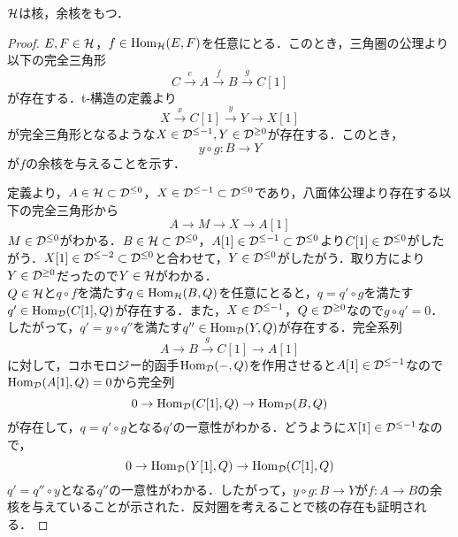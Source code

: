 \begin{lemm}\cite{BBD}
	${\mathcal H}$は核，余核をもつ．
\end{lemm}
\begin{proof}
	$E,F\in{\mathcal H}$，$f\in\operatorname{\mathrm{Hom}}_{{\mathcal H}}(E,F)$を任意にとる．このとき，三角圏の公理より以下の完全三角形
	\[C\xrightarrow{e}A\xrightarrow{f}B\xrightarrow{g}C[1]\]
	が存在する．t-構造の定義より
	\[X\xrightarrow{x}C[1]\xrightarrow{y}Y\rightarrow X[1]\]
	が完全三角形となるような$X\in {\mathcal D}^{\le -1},Y\in {\mathcal D}^{\ge 0}$が存在する．このとき，
	\[y\circ g\colon B\rightarrow Y\]
	が$f$の余核を与えることを示す．
	\begin{comment}
			\[
				\begin{tikzcd}[column sep=huge,row sep =huge]
					B[-1] \ar[r,"g\texttt{[-1]}"]\ar[d,equal]& C\ar[r,]\ar[d,"y\texttt{[-1]}",swap]& A\ar[d,"\ell",dotted] \ar[r,"f"]& B\ar[d,equal]\\
					B[-1] \ar[r,"y\texttt{[-1]}\circ g\texttt{[-1]}"]\ar[d,"g\texttt{[-1]}",swap]& Y[-1]\ar[r,]\ar[d,equal]& M\ar[d,dotted] \ar[r,"m"]& B\ar[d,"g"]\\
					C \ar[r,]\ar[d,swap]& Y[-1]\ar[r,]\ar[d,swap]& X \ar[r,"x"]\ar[d,equal]& C[1] \ar[d,]\\
			A \ar[r,"\ell",dotted]& M\ar[r,dotted]&  X\ar[r,dotted]& A[1]\\
		\end{tikzcd}
			\]
\end{comment}	
			定義より，$A\in{\mathcal H}\subset{\mathcal D}^{\le 0}$，$X\in{\mathcal D}^{\le -1}\subset{\mathcal D}^{\le 0}$であり，八面体公理より存在する以下の完全三角形から
	\[A\rightarrow M\rightarrow X\rightarrow A[1]\]
	$M\in{\mathcal D}^{\le 0}$がわかる．$B\in{\mathcal H}\subset{\mathcal D}^{\le 0}$，$A[1]\in {\mathcal D}^{\le -1}\subset {\mathcal D}^{\le 0}$より$C[1]\in{\mathcal D}^{\le 0}$がしたがう．$X[1]\in{\mathcal D}^{\le -2}\subset{\mathcal D}^{\le 0}$と合わせて，$Y\in{\mathcal D}^{\le 0}$がしたがう．取り方により$Y\in{\mathcal D}^{\ge 0}$だったので$Y\in{\mathcal H}$がわかる．\\
	$Q\in{\mathcal H}$と$q\circ f$を満たす$q\in\operatorname{\mathrm{Hom}}_{{\mathcal H}}(B,Q)$を任意にとると，$q=q'\circ g$を満たす$q'\in\operatorname{\mathrm{Hom}}_{{\mathcal D}}(C[1],Q)$が存在する．また，$X\in{\mathcal D}^{\le -1}$，$Q\in{\mathcal D}^{\ge 0}$なので$g\circ q'=0$．したがって，$q'=y\circ q''$を満たす$q''\in\operatorname{\mathrm{Hom}}_{{\mathcal D}}(Y,Q)$が存在する．完全系列
	\[A\rightarrow B\xrightarrow{g} C[1]\rightarrow A[1]\]
	に対して，コホモロジー的函手$\operatorname{\mathrm{Hom}}_{{\mathcal D}}(-,Q)$を作用させると$A[1]\in{\mathcal D}^{\le -1}$なので$\operatorname{\mathrm{Hom}}_{{\mathcal D}}(A[1],Q)=0$から完全列
	\[0\rightarrow \operatorname{\mathrm{Hom}}_{{\mathcal D}}(C[1],Q) \rightarrow \operatorname{\mathrm{Hom}}_{{\mathcal D}}(B,Q)\]
	が存在して，$q=q'\circ g$となる$q'$の一意性がわかる．どうように$X[1]\in{\mathcal D}^{\le -1}$なので，
	\[0\rightarrow \operatorname{\mathrm{Hom}}_{{\mathcal D}}(Y[1],Q) \rightarrow \operatorname{\mathrm{Hom}}_{{\mathcal D}}(C[1],Q)\]
	$q'=q''\circ y$となる$q''$の一意性がわかる．したがって，$y\circ g\colon B\to Y$が$f\colon A\to B$の余核を与えていることが示された．反対圏を考えることで核の存在も証明される．
\end{proof}

